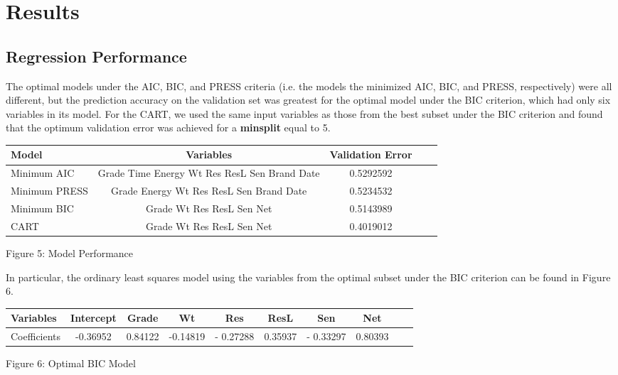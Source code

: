 \documentclass[12pt]{article}
\begin{document}
\section{Results}
\subsection{Regression Performance}
The optimal models under the AIC, BIC, and PRESS criteria (i.e. the models the minimized AIC, BIC, and PRESS, respectively) were all different, but the prediction accuracy on the validation set was greatest for the optimal model under the BIC criterion, which had only six variables in its model. For the CART, we used the same input variables as those from the best subset under the BIC criterion and found that the optimum validation error was achieved for a {\bf minsplit} equal to 5.\\

{\centering
\begin{tabular}{l*{3}{c}r}
Model            & Variables & Validation Error\\
\hline
Minimum AIC & Grade Time Energy Wt Res ResL Sen Brand Date & 0.5292592\\
Minimum PRESS & Grade Energy Wt Res ResL Sen Brand Date & 0.5234532\\
Minimum BIC & Grade Wt Res ResL Sen Net & 0.5143989\\
CART & Grade Wt Res ResL Sen Net & 0.4019012\\
\end{tabular}\par\smallskip}

{\centering
Figure 5: Model Performance \par\bigskip}

In particular, the ordinary least squares model using the variables from the optimal subset under the BIC criterion can be found in Figure 6.\\

{\centering
\begin{tabular}{l*{8}{c}r}
Variables  & Intercept & Grade & Wt & Res & ResL & Sen & Net\\
\hline
Coefficients & -0.36952 & 0.84122 & -0.14819 & - 0.27288 & 0.35937 & - 0.33297 & 0.80393 \\
\end{tabular}\par\smallskip}

{\centering
Figure 6: Optimal BIC Model \par\bigskip}
\end{document}
